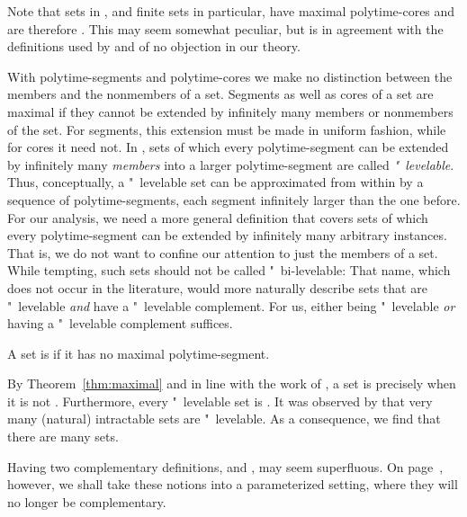 Note that sets in , and finite sets in particular, have maximal polytime-cores and are therefore .
This may seem somewhat peculiar, but is in agreement with the definitions used by \textcite{orponen1986classification} and of no objection in our theory.

With polytime-segments and polytime-cores we make no distinction between the members and the nonmembers of a set.
Segments as well as cores of a set are maximal if they cannot be extended by infinitely many members or nonmembers of the set.
For segments, this extension must be made in uniform fashion, while for cores it need not.
In \parencite{orponen1985polynomial,orponen1986optimal}, sets of which every polytime-segment can be extended by infinitely many \emph{members} into a larger polytime-segment are called \emph{"~levelable}.
Thus, conceptually, a "~levelable set can be approximated from within by a sequence of polytime-segments, each segment infinitely larger than the one before.
For our analysis, we need a more general definition that covers sets of which every polytime-segment can be extended by infinitely many arbitrary instances.
That is, we do not want to confine our attention to just the members of a set.
While tempting, such sets should not be called "~bi-levelable:
That name, which does not occur in the literature, would more naturally describe sets that are "~levelable \emph{and} have a "~levelable complement.
For us, either being "~levelable \emph{or} having a "~levelable complement suffices.
\begin{definition}
\label{def:semi-levelable}%
  A set is  if it has no maximal polytime-segment.
\end{definition}
By Theorem~\ref{thm:maximal} and in line with the work of \textcite{orponen1985polynomial}, a set is  precisely when it is not .
Furthermore, every "~levelable set is .
It was observed by \textcite{orponen1986optimal} that very many (natural) intractable sets are "~levelable.
As a consequence, we find that there are many  sets.

Having two complementary definitions,  and , may seem superfluous.
On page~\pageref{def:fpt-levelable}, however, we shall take these notions into a parameterized setting, where they will no longer be complementary.


